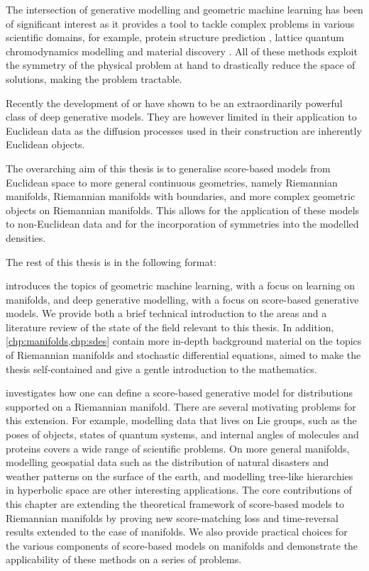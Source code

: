 The intersection of generative modelling and geometric machine learning has been of significant interest as it provides a tool to tackle complex problems in various scientific domains, for example, protein structure prediction \parencite{jumper2021highly}, lattice quantum chromodynamics modelling \parencite{abbott2024applications} and material discovery \parencite{merchant2023scaling}. All of these methods exploit the symmetry of the physical problem at hand to drastically reduce the space of solutions, making the problem tractable.

Recently the development of  or  \parencite{sohl2015deep,song2019generative,ho2020denoising} have shown to be an extraordinarily powerful class of deep generative models.
They are however limited in their application to Euclidean data as the diffusion processes used in their construction are inherently Euclidean objects.

The overarching aim of this thesis is to generalise score-based models from Euclidean space to more general continuous geometries, namely Riemannian manifolds, Riemannian manifolds with boundaries, and more complex geometric objects on Riemannian manifolds.
This allows for the application of these models to non-Euclidean data and for the incorporation of symmetries into the modelled densities.

The rest of this thesis is in the following format:

 introduces the topics of geometric machine learning, with a focus on learning on manifolds, and deep generative modelling, with a focus on score-based generative models.
We provide both a brief technical introduction to the areas and a literature review of the state of the field relevant to this thesis.
In addition, \cref{chp:manifolds,chp:sdes} contain more in-depth background material on the topics of Riemannian manifolds and stochastic differential equations, aimed to make the thesis self-contained and give a gentle introduction to the mathematics.

 investigates how one can define a score-based generative model for distributions supported on a Riemannian manifold.
There are several motivating problems for this extension.
For example, modelling data that lives on Lie groups, such as the poses of objects, states of quantum systems, and internal angles of molecules and proteins covers a wide range of scientific problems.
On more general manifolds, modelling geospatial data such as the distribution of natural disasters and weather patterns on the surface of the earth, and modelling tree-like hierarchies in hyperbolic space are other interesting applications.
The core contributions of this chapter are extending the theoretical framework of score-based models to Riemannian manifolds by proving new score-matching loss and time-reversal results extended to the case of manifolds.
We also provide practical choices for the various components of score-based models on manifolds and demonstrate the applicability of these methods on a series of problems.

